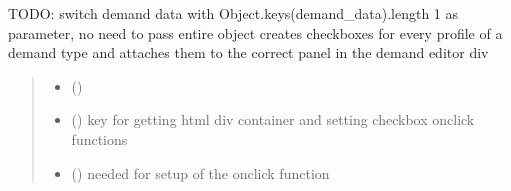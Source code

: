 \documentclass[letterpaper,10pt,english]{sphinxmanual}
\begin{document}

\begin{fulllineitems}
\label{\detokenize{docs_gui/js_api/urbs_editor/demand_editor:populateDemandEditor}}
\pysigstartsignatures
{}
\pysigstopsignatures
\sphinxAtStartPar
TODO: switch demand data with Object.keys(demand\_data).length \sphinxhyphen{} 1 as parameter, no need to pass entire object
creates checkboxes for every profile of a demand type and attaches them to the correct panel in the demand editor div
\begin{quote}\begin{description}
\begin{itemize}
\item {} 
\sphinxAtStartPar
{} () \textendash{} 

\item {} 
\sphinxAtStartPar
{} () \textendash{} key for getting html div container and setting checkbox onclick functions

\item {} 
\sphinxAtStartPar
{} () \textendash{} needed for setup of the onclick function

\end{itemize}

\end{description}\end{quote}

\end{fulllineitems}

\end{document}
